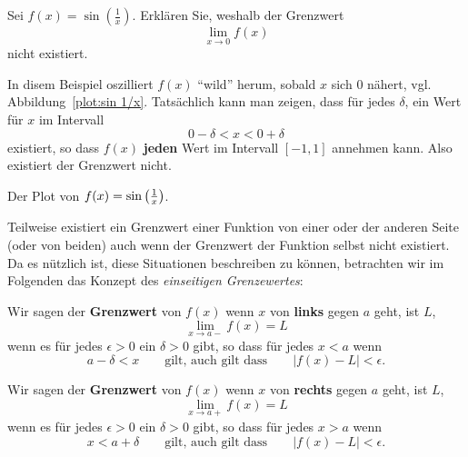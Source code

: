 \begin{example}
Sei $f(x) = \sin\left(\frac{1}{x}\right)$. Erklären Sie, weshalb der Grenzwert
\[
\lim_{x\to 0} f(x)
\]
nicht existiert.
\end{example}
\begin{solution}
In disem Beispiel oszilliert $f(x)$ ``wild'' herum, sobald $x$ sich $0$ nähert, vgl. Abbildung~\ref{plot:sin 1/x}. Tatsächlich kann man zeigen, dass für jedes   $\delta$, ein Wert für $x$ im Intervall
\[
0-\delta < x < 0+\delta
\]
existiert, so dass $f(x)$ \textbf{jeden} Wert im Intervall $[-1,1]$ annehmen kann. Also existiert der Grenzwert nicht.
\end{solution}
\begin{marginfigure}[-1in]
\caption{Der Plot von $f(x)=\protect\sin\left(\frac{1}{x}\right)$.}
\label{plot:sin 1/x}
\end{marginfigure}

Teilweise existiert ein Grenzwert einer Funktion von einer oder der anderen Seite (oder von beiden) auch wenn der Grenzwert der Funktion selbst nicht existiert. Da es nützlich ist, diese Situationen beschreiben zu können, betrachten wir im Folgenden das Konzept des \textit{einseitigen Grenzewertes}:

\begin{definition} Wir sagen der \textbf{Grenzwert} von $f(x)$ wenn $x$ von \textbf{links} gegen $a$ geht, ist $L$,
\[
\lim_{x\to a-}f(x)=L
\]
wenn es für jedes $\epsilon>0$ ein $\delta > 0$ gibt, so dass für jedes $x< a$ wenn 
\[
a-\delta < x \qquad\text{gilt, auch gilt dass}\qquad |f(x)-L|<\epsilon.
\]

Wir sagen der \textbf{Grenzwert} von $f(x)$ wenn $x$ von \textbf{rechts} gegen $a$ geht, ist $L$,
\[
\lim_{x\to a+}f(x)=L
\] 
wenn es für jedes $\epsilon>0$ ein $\delta > 0$ gibt, so dass für jedes $x > a$ wenn 
\[
x<a+\delta \qquad\text{gilt, auch gilt dass}\qquad |f(x)-L|<\epsilon.
\]
\end{definition}


